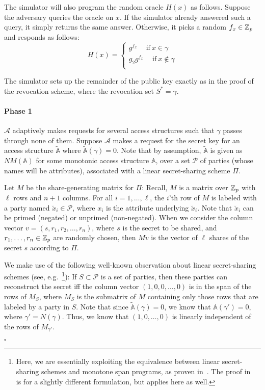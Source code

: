\documentclass[a4paper, 11pt]{article}
\newenvironment{proof}{\par\noindent{\bf Proof.}}{$\square$\par\bigskip}
\theoremstyle{definition}
\begin{document}
\begin{proof}
The simulator will also program the random oracle $H(x)$ as follows.
Suppose the adversary queries the oracle on $x$. If the simulator
already answered such a query, it simply returns the same answer.
Otherwise, it picks a random $f_x \in \mathbb{Z}_p$ and responds as follows:
\[
H(x) =
\begin{cases}
g^{f_x} \quad \mathrm{~if~} x \in \gamma\\
g_2 g^{f_x} \quad \mathrm{~if~} x \notin \gamma\\
\end{cases}
\]


The simulator sets up the remainder of the public key exactly as in
the proof of the revocation scheme, where the revocation set $S^* =
\gamma$.

\paragraph{Phase 1}$\mathcal{A}$ adaptively makes requests
for several access structures such that $\gamma$ passes through none
of them. Suppose $\mathcal{A}$ makes a request for the secret key
for an access structure $\mathbb{\tilde{A}}$ where $\mathbb{\tilde{A}}(\gamma)=0$.  Note that by assumption, $\mathbb{\tilde{A}}$ is given as $NM(\mathbb{{A}})$ for some monotonic access structure $\mathbb{A}$,
over a set $\mathcal{P}$ of parties (whose names will be attributes), associated with a linear secret-sharing scheme $\Pi$.

Let $M$ be the share-generating matrix for $\Pi$:
Recall, $M$ is a matrix over $\mathbb{Z}_p$ with $\ell$ rows
and $n+1$ columns.
For all $i=1,\dots,\ell$, the $i$'th row of $M$ is labeled with a party named $\breve{x}_i \in \mathcal{P}$, where $x_i$
is the attribute underlying $\breve{x}_i$.  Note that $\breve{x}_i$
can be primed (negated) or unprimed (non-negated).
When we consider the column
vector $v=(s,r_1, r_2, \dots, r_n)$, where $s$ is the secret to be
shared, and $r_1, \dots, r_n \in \mathbb{Z}_p$ are randomly chosen,
then $Mv$ is the vector of $\ell$ shares of the secret $s$ according to $\Pi$.

We make use of the following well-known observation about linear secret-sharing schemes (see, e.g.~\cite{bei}\footnote{
Here, we are essentially exploiting the equivalence between
linear secret-sharing schemes and monotone span programs, as
proven in~\cite{bei}.  The proof in~\cite{bei} is for a slightly
different formulation, but applies here as well.}):  If $S \subset \mathcal{P}$ is a set of parties, then these parties can reconstruct the secret iff the column vector
$(1,0,0, \dots, 0)$ is in the span of the rows of $M_S$, where $M_S$ is the submatrix of $M$ containing only those rows that are labeled by a party in $S$.  Note that since $\mathbb{\tilde{A}}(\gamma)=0$,
we know that $\mathbb{A}(\gamma')=0$, where $\gamma' = N(\gamma)$.
Thus, we know that $(1,0,\dots,0)$ is linearly independent of the
rows of $M_{\gamma'}$.


\end{proof}
\end{document}
